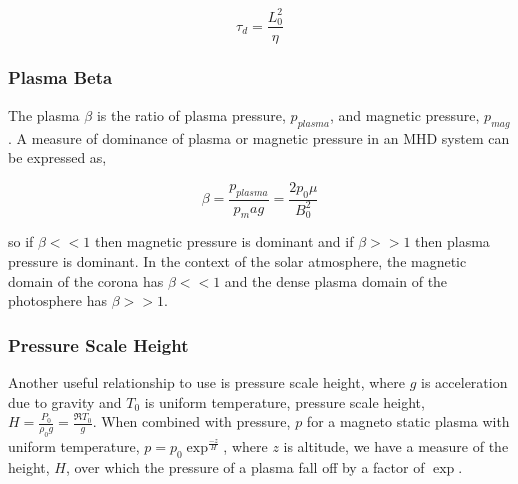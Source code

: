 \begin{equation}\label{difftime}
\tau_d = \frac{L_{0}^{2}}{\eta}
\end{equation}

\citep{2003dysu.book.....D}

%
\subsubsection{Plasma Beta}
The plasma $\beta$ is the ratio of plasma pressure, $p_{plasma}$, and magnetic pressure, $p_{mag}$. A measure of dominance of plasma or magnetic pressure in an MHD system can be expressed as, 

\begin{equation}\label{beta}
\beta=\frac{p_{plasma}}{p_mag} = \frac{2p_{0}\mu}{B_{0}^2}
\end{equation}

so if $\beta << 1$ then magnetic pressure is dominant and if $\beta >> 1$ then plasma pressure is dominant. In the context of the solar atmosphere, the magnetic domain of the corona has $\beta << 1$ and the dense plasma domain of the photosphere has $\beta >> 1$.

\subsubsection{Pressure Scale Height}
Another useful relationship to use is pressure scale height, where $g$ is acceleration due to gravity and $T_0$ is uniform temperature, pressure scale height, $H=\frac{P_0}{\rho_{0}g} = \frac{\Re T_{0}}{g}$. When combined with pressure, $p$ for a magneto static plasma with uniform temperature, $p=p_{0}\exp^{\frac{-z}{H}}$, where $z$ is altitude, we have a measure of the height, $H$, over which the pressure of a plasma fall off by a factor of $\exp$. 


